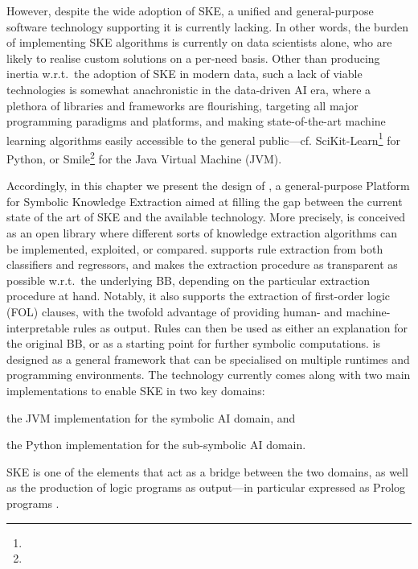 \documentclass[12pt,a4paper,openright,twoside]{book}
\begin{document}
%
However, despite the wide adoption of SKE, a unified and general-purpose software technology supporting it is currently lacking.
%
In other words, the burden of implementing SKE algorithms is currently on data scientists alone, who are likely to realise custom solutions on a per-need basis.
%
Other than producing inertia w.r.t.\ the adoption of SKE in modern data, such a lack of viable technologies is somewhat anachronistic in the data-driven AI era, where a plethora of libraries and frameworks are flourishing, targeting all major programming paradigms and platforms, and making state-of-the-art machine learning algorithms easily accessible to the general public---cf. SciKit-Learn\footnote{} for Python, or Smile\footnote{} for the Java Virtual Machine (JVM).

Accordingly, in this chapter we present the design of \psyke{}, a general-purpose Platform for Symbolic Knowledge Extraction aimed at filling the gap between the current state of the art of SKE and the available technology.
%
More precisely, \psyke{} is conceived as an open library where different sorts of knowledge extraction algorithms can be implemented, exploited, or compared.
%
\psyke{} supports rule extraction from both classifiers and regressors, and makes the extraction procedure as transparent as possible w.r.t.\ the underlying BB, depending on the particular extraction procedure at hand.
%
Notably, it also supports the extraction of first-order logic (FOL) clauses, with the twofold advantage of providing human- and machine-interpretable rules as output.
%
Rules can then be used as either an explanation for the original BB, or as a starting point for further symbolic computations.
%
\psyke{} is designed as a general framework that can be specialised on multiple runtimes and programming environments.
%
The technology currently comes along with two main implementations to enable SKE in two key domains:
%
\begin{inlinelist}
    \item the JVM implementation for the symbolic AI domain, and
    \item the Python implementation for the sub-symbolic AI domain.
\end{inlinelist}
%
SKE is one of the elements that act as a bridge between the two domains, as well as the production of logic programs \cite{lloyd1990computational,metakides1996principles} as output---in particular expressed as Prolog programs \cite{ColmerauerR93}.
\end{document}
